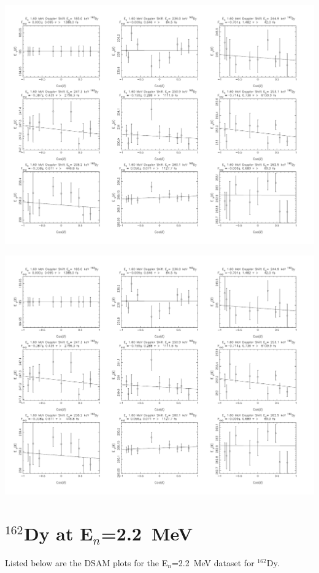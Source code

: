 \begin{center}
\includegraphics[page=4,angle=90,height=0.95\textheight]{162Dy_ftau_160_n.pdf}
\end{center}

\begin{center}
\includegraphics[page=5,angle=90,height=0.95\textheight]{162Dy_ftau_160_n.pdf}
\end{center}
\section{$^{162}$Dy at E$_n$=2.2~MeV}\label{app:DSAM_Dy_22}
Listed below are the DSAM plots for the E$_n$=2.2~MeV dataset for $^{162}$Dy.

